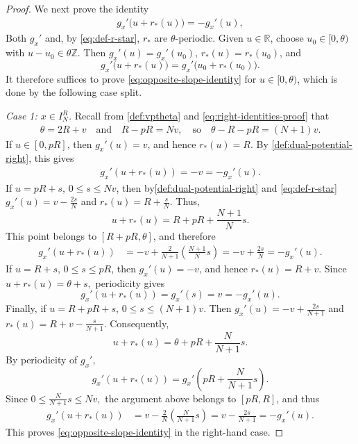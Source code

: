 \documentclass{article}
\begin{document}
\begin{proof}
We next prove the identity
\begin{align}\label{eq:opposite-slope-identity}
    g_x'\bigl(u+r_*(u)\bigr)
    =
    -g_x'(u),
\end{align}
Both \(g_x'\) and, by \eqref{eq:def-r-star}, \(r_*\) are \(\theta\)-periodic.
Given \(u\in\mathbb R\), choose \(u_0\in[0,\theta)\) with \(u-u_0\in\theta\mathbb Z\).
Then \(g_x'(u)=g_x'(u_0)\), \(r_*(u)=r_*(u_0)\), and
\[
    g_x'\bigl(u+r_*(u)\bigr)
    =g_x'\bigl(u_0+r_*(u_0)\bigr).
\]
It therefore suffices to prove \eqref{eq:opposite-slope-identity} for \(u\in[0,\theta)\), which is done by the following case split.

\medskip
\noindent
\emph{Case 1: \(x\in I_N^R\).}
Recall from \eqref{def:vptheta} and \eqref{eq:right-identities-proof} that
\begin{align*}
    \theta=2R+v \quad \text{and} \quad R-pR=Nv, \quad \text{so} \quad \theta-R-pR=(N+1)v.
\end{align*}
If \(u\in[0,pR]\), then \(g_x'(u)=v\), and hence \(r_*(u)=R\).
By \eqref{def:dual-potential-right}, this gives
\begin{align*}
    g_x'(u + r_*(u)) = -v = -g_x'(u).
\end{align*}
If \(u=pR+s\), \(0\leq s\leq Nv\), then by\eqref{def:dual-potential-right} and \eqref{eq:def-r-star} \(g_x'(u)=v-\frac{2s}{N}\) and \(r_*(u) = R+\frac{s}{N}. \) Thus,
\[
    u+r_*(u)
    =
    R+pR+\frac{N+1}{N}s.
\]
This point belongs to \([R+pR,\theta]\), and therefore
\begin{align*}
    g_x'(u+r_*(u))
    &=
    -v
    +
    \frac{2}{N+1}
    \left(
        \frac{N+1}{N}s
    \right)
    =
    -v+\frac{2s}{N}
    =
    -g_x'(u).
\end{align*}
If \(u=R+s\), \(0\leq s\leq pR\), then \(g_x'(u)=-v\), and hence \(r_*(u)=R+v\).
Since \(u+r_*(u) = \theta+s, \) periodicity gives
\[
    g_x'(u+r_*(u))
    =
    g_x'(s)
    =
    v
    =
    -g_x'(u).
\]
Finally, if \(u=R+pR+s\), \(0\leq s\leq(N+1)v\).
Then \(g_x'(u) = -v+\frac{2s}{N+1} \) and \(r_*(u) = R+v-\frac{s}{N+1} \).
Consequently,
\[
    u+r_*(u)
    =
    \theta+pR+\frac{N}{N+1}s.
\]
By periodicity of \(g_x'\),
\[
    g_x'(u+r_*(u))
    =
    g_x'\left(
        pR+\frac{N}{N+1}s
    \right).
\]
Since \(0 \leq \frac{N}{N+1}s \leq Nv, \) the argument above belongs to \([pR,R]\), and thus
\begin{align*}
    g_x'(u+r_*(u))
    &=
    v
    -
    \frac{2}{N}
    \left(
        \frac{N}{N+1}s
    \right)
    =
    v-\frac{2s}{N+1}
    =
    -g_x'(u).
\end{align*}
This proves \eqref{eq:opposite-slope-identity} in the right-hand case.


\end{proof}
\end{document}
